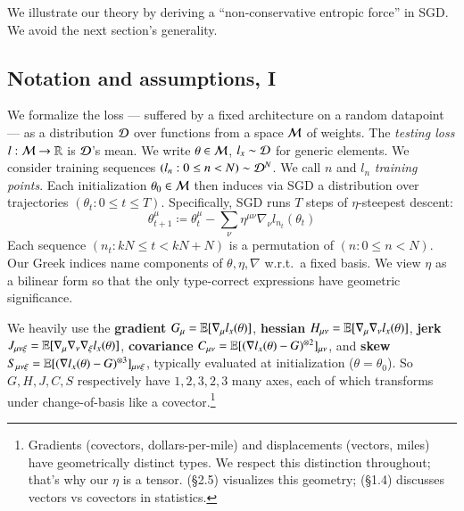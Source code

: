   We illustrate our theory by deriving a ``non-conservative
entropic force'' in SGD.  We avoid the next section's generality.%
%
%


\subsection{Notation and assumptions, I}\label{sect:setup}

  We formalize the loss --- suffered by a fixed architecture on a random
datapoint --- as a distribution $\mathcal{D}$ over functions from a space $\mathcal{M}$ of
weights.  The \emph{testing loss} $l:\mathcal{M}\to\mathbb{R}$ is $\mathcal{D}$'s mean.  We write
$\theta\in\mathcal{M}$, $l_x\sim\mathcal{D}$ for generic elements.
%
We consider training sequences $(l_n: 0\leq n<N) \sim \mathcal{D}^N$.  We call
$n$ and $l_n$ \emph{training points}.
%
Each initialization $\theta_0 \in \mathcal{M}$ then induces via SGD a
distribution over trajectories $(\theta_t: 0\leq t \leq T)$.  Specifically,
SGD runs $T$ steps of $\eta$-steepest descent:
  \begin{equation*}
    \textstyle
    \theta_{t+1}^\mu
    \coloneqq
    \theta_t^\mu -
    \sum_{\nu}
    \eta^{\mu\nu} \nabla_\nu l_{n_t}(\theta_t)
  \end{equation*}
Each sequence $(n_t: kN\leq t<kN+N)$ is a permutation of $(n:
0\leq n<N)$.  Our Greek indices name components of
$\theta,\eta,\nabla$ w.r.t.\ a fixed basis.  We view $\eta$
as a bilinear form %
so that the only type-correct expressions have geometric significance.
%

We heavily use the
\textbf{gradient} $G_\mu = \mathbb{E}[\nabla_\mu l_x(\theta)]$, %
\textbf{hessian} $H_{\mu\nu} = \mathbb{E}[\nabla_\mu\nabla_\nu l_x(\theta)]$, %
\textbf{jerk} \squish $J_{\mu\nu\xi} = \mathbb{E}[\nabla_\mu\nabla_\nu\nabla_\xi l_x(\theta)]$, %
\textbf{covariance} $C_{\mu\nu} = \mathbb{E}[(\nabla l_x(\theta) - G)^{\otimes 2}]_{\mu\nu}$, %
and
\textbf{skew} \squash $S_{\mu\nu\xi} = \mathbb{E}[(\nabla l_x(\theta) - G)^{\otimes 3}]_{\mu\nu\xi}$, %
typically evaluated at
initialization ($\theta=\theta_0$).
So $G, H, J, C, S$ respectively have $1, 2, 3, 2, 3$ many axes, each of which
transforms under change-of-basis like a covector.\footnote{
    Gradients
    (covectors, dollars-per-mile) and displacements (vectors, miles) have geometrically
    distinct types.  We respect this distinction throughout; that's
    why our $\eta$ is a tensor.
    \cite{mi73} (\S2.5) visualizes this geometry;
    \cite{cu87} (\S1.4) discusses vectors vs covectors in statistics.
}

